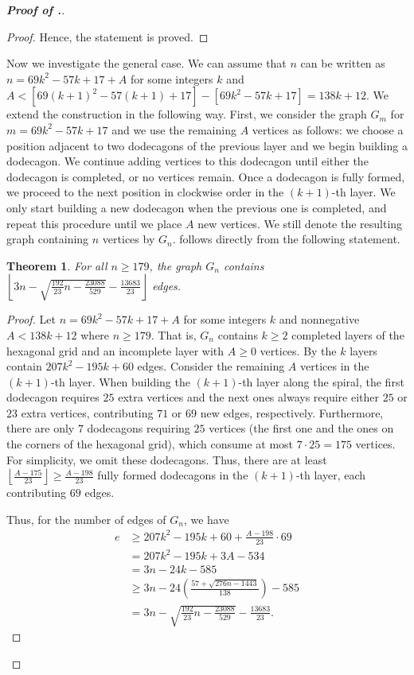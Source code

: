 \documentclass[10pt,a4paper]{amsart}
\newtheorem{theorem}{Theorem}
\begin{document}
\begin{proof}[\bf Proof of .]
\begin{proof}
    Hence, the statement is proved.
\end{proof}


Now we investigate the general case. We can assume that $n$ can be written as $n=69k^2-57k+17+A$ for some integers $k$ and $A<[69(k+1)^2-57(k+1)+17]-[69k^2-57k+17]=138k+12$. 
We extend the construction in the following way. First, we consider the graph $G_m$ for $m=69k^2-57k+17$ and we use the remaining $A$ vertices as follows: we choose a position adjacent to two dodecagons of the previous layer and we begin building a dodecagon. We continue adding vertices to this dodecagon until either the dodecagon is completed, or no vertices remain. Once a dodecagon is fully formed, we proceed to the next position in clockwise order in the $(k+1)$-th layer. We only start building a new dodecagon when the previous one is completed, and repeat this procedure until we place $A$ new vertices.
We still denote the resulting graph containing $n$ vertices by $G_n$.  follows directly from the following statement.
\begin{theorem}
For all $n \geq 179$, the graph $G_n$ contains
$\left\lfloor3n-\sqrt{\frac{192}{23}n-\frac{23088}{529}}-\frac{13683}{23}\right\rfloor$ edges.
\end{theorem}

\begin{proof}
Let $n=69k^2-57k+17+A$ for some integers $k$ and nonnegative $A<138k+12$ where $n \geq 179$. That is, $G_n$ contains $k \geq 2$ completed layers of the hexagonal grid and an incomplete layer with $A \geq 0$ vertices. By  the $k$ layers contain $207k^2-195k+60$ edges. Consider the remaining $A$ vertices in the $(k+1)$-th layer. When building the $(k+1)$-th layer along the spiral, the first dodecagon requires $25$ extra vertices and the next ones always require either $25$ or $23$ extra vertices, contributing $71$ or $69$ new edges, respectively.
Furthermore, there are only $7$ dodecagons requiring $25$ vertices (the first one and the ones on the corners of the hexagonal grid), which consume at most $7 \cdot 25 = 175$ vertices. For simplicity, we omit these dodecagons. Thus, there are at least $\left\lfloor\frac{A-175}{23}\right\rfloor\geq \frac{A-198}{23}$ fully formed dodecagons in the $(k+1)$-th layer, each contributing $69$ edges.

Thus, for the number of edges of $G_n$, we have
\begin{align}
e&\geq 207k^2-195k+60+\frac{A-198}{23}\cdot69  \nonumber\\
&=207k^2-195k+3A-534 \nonumber\\
&= 3n-24k-585 \label{eq9} \\
&\geq 3n - 24 \left( \frac{57 + \sqrt{276n - 1443}}{138} \right) - 585 \label{eq10}\\
&= 3n - \sqrt{\frac{192}{23}n - \frac{23088}{529}} - \frac{13683}{23}. \nonumber
\end{align}


\end{proof}
\end{proof}
\end{document}
